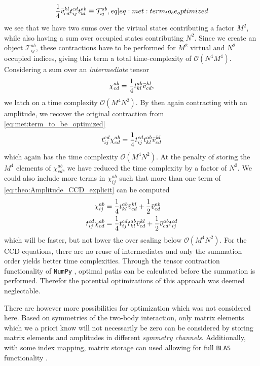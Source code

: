 \begin{align}
    \frac{1}{4}\elmASshort{kl}{cd}\amplitude{cd}{ij}\amplitude{ab}{kl} \equiv \mathcal{T}^{ab}_{ij}, \label[eq]{eq:met:term_to_be_optimized}
\end{align}
we see that we have two sums over the virtual states contributing a factor $M^2$, while also having a sum over occupied states contributing $N^2$. Since we create an object $\mathcal{T}^{ab}_{ij}$, these contractions have to be performed for $M^2$ virtual and $N^2$ occupied indices, giving this term a total time-complexity of $\mathcal{O}(N^4 M^4)$. Considering a sum over an \textit{intermediate} tensor 
\begin{align*}
    \chi^{ab}_{cd} = \frac{1}{4}t^{ab}_{kl}\bar{v}^{kl}_{cd},
\end{align*}
we latch on a time complexity $\mathcal{O}(M^4 N^2)$. By then again contracting with an amplitude, we recover the original contraction from \cref{eq:met:term_to_be_optimized}
\begin{align*}
    t^{cd}_{ij}\chi^{ab}_{cd} = \frac{1}{4} t^{cd}_{ij}t^{ab}_{kl} \bar{v}^{kl}_{cd}
\end{align*}
which again has the time complexity $\mathcal{O}(M^4 N^2)$. At the penalty of storing the $M^4$ elements of $\chi^{ab}_{cd}$, we have reduced the time complexity by a factor of $N^2$. We could also include more terms in $\chi^{ab}_{ij}$ such that more than one term of \cref{eq:theo:Amplitude_CCD_explicit} can be computed
\begin{align*}
    \chi^{ab}_{ij} &= \frac{1}{4}t^{ab}_{kl}\bar{v}^{kl}_{cd} + \frac{1}{2} \bar{v}^{ab}_{cd} \\
    t^{cd}_{ij}\chi^{ab}_{cd} &= \frac{1}{4} t^{cd}_{ij}t^{ab}_{kl} \bar{v}^{kl}_{cd} + \frac{1}{2}\bar{v}^{ab}_{cd}t^{cd}_{ij}
\end{align*}
which will be faster, but not lower the over scaling below $\mathcal{O}(M^4 N^2)$. For the CCD equations, there are no reuse of intermediates and only the summation order yields better time complexities. Through the tensor contraction functionality of \verb|NumPy| \citep{vanderwaltNumPyArrayStructure2011}, optimal paths can be calculated before the summation is performed. Therefor the potential optimizations of this approach was deemed neglectable. 

There are however more possibilities for optimization which was not considered here. Based on symmetries of the two-body interaction, only matrix elements which we a priori know will not necessarily be zero can be considered by storing matrix elements and amplitudes in different \textit{symmetry channels}. Additionally, with some index mapping, matrix storage can used allowing for full \verb|BLAS| functionality \citep{blackford2002updated}.

